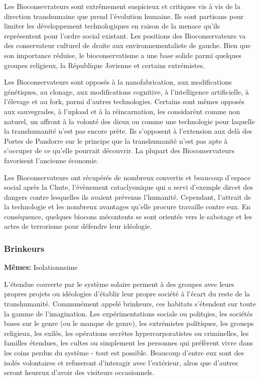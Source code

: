 Les Bioconsevrateurs sont extrêmement suspicieux et critiques vis à vis de la direction transhumaine que prend l'évolution humaine. Ils sont partisans pour limiter les développement technologiques en raison de la menace qu'ils représentent pour l'ordre social existant. Les positions des Bioconservateurs va des conservateur culturel de droite aux environnementaliste de gauche. Bien que son importance réduise, le bioconservatisme a une base solide parmi quelques groupes religieux, la République Jovienne et certains extrémistes. 

Les Bioconservateurs sont opposés à la nanofabrication, aux modifications génétiques, au clonage, aux modifications cognitive, à l'intelligence artificielle, à l'élevage et au fork, parmi d'autres technologies. Certains sont mêmes opposés aux sauvegrades, à l'upload et à la réincarnation, les considarént comme non naturel, un affront à la volonté des dieux ou comme une technologie pour laquelle la transhumanité n'est pas encore prète. Ils s'opposent à l'extension aux delà des Portes de Pandorre sur le principe que la transhumanité n'est pas apte à s'occuper de ce qu'elle pourrait découvrir. La plupart des Bioconservateurs favorisent l'ancienne économie. 

Les Bioconservateurs ont récupérés de nombreux convertis et beaucoup d'espace social après la Chute, l'évènement cataclysmique qui a servi d'exemple dircet des dangers contre lesquelles ils avaient prévenus l'humanité. Cependant, l'attrait de la technologie et les nombreux avantages qu'elle procure travaille contre eux. En conséquence, quelques biocons mécontents se sont orientés vers le sabotage et les actes de terrorisme pour défendre leur idéologie. 

\subsubsection{Brinkeurs} \label{sec:brinkers} 

\textbf{Mêmes:} Isolationnsime 

L'étendue couverte par le système solaire perment à des groupes avec leurs propres projets ou idéologies d'établir leur propre société à l'écart du reste de la transhumanité. Communément appelé brinkeurs, ces habitats s'étendent sur toute la gamme de l'imagination. Les expérimentations sociale ou politqies, les sociétés bases sur le genre (ou le manque de genre), les extrémistes politiques, les groueps religieux, les exilés, les opérations secrètes hypercorporatistes ou criminelles, les familles étendues, les cultes ou simplement les personnes qui préfèrent vivre dans les coins perdus du système - tout est possible. Beaucoup d'entre eux sont des isolés volontaires et refuseront d'interagir avec l'extérieur, alros que d'autres seront heureux d'avoir des visiteurs occasionnels. 

